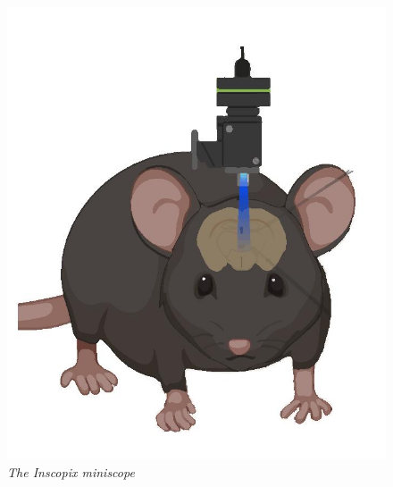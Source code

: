 \documentclass[12pt, a4paper]{article}
\begin{document}
\begin{figure}[H]
	\begin{center}
		\includegraphics[scale=.35]{Inscopix.jpg} 
	\end{center} 
	\caption{\textit{The Inscopix miniscope}}
	
\end{figure}
\end{document}

